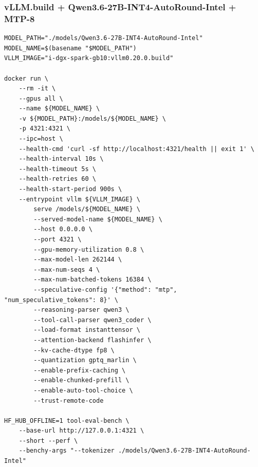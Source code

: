 \documentclass{article}
\begin{document}
\subsubsection{vLLM.build + Qwen3.6-27B-INT4-AutoRound-Intel + MTP-8}
\begin{lstlisting}
MODEL_PATH="./models/Qwen3.6-27B-INT4-AutoRound-Intel"
MODEL_NAME=$(basename "$MODEL_PATH")
VLLM_IMAGE="i-dgx-spark-gb10:vllm0.20.0.build"

docker run \
    --rm -it \
    --gpus all \
    --name ${MODEL_NAME} \
    -v ${MODEL_PATH}:/models/${MODEL_NAME} \
    -p 4321:4321 \
    --ipc=host \
    --health-cmd 'curl -sf http://localhost:4321/health || exit 1' \
    --health-interval 10s \
    --health-timeout 5s \
    --health-retries 60 \
    --health-start-period 900s \
    --entrypoint vllm ${VLLM_IMAGE} \
        serve /models/${MODEL_NAME} \
        --served-model-name ${MODEL_NAME} \
        --host 0.0.0.0 \
        --port 4321 \
        --gpu-memory-utilization 0.8 \
        --max-model-len 262144 \
        --max-num-seqs 4 \
        --max-num-batched-tokens 16384 \
        --speculative-config '{"method": "mtp", "num_speculative_tokens": 8}' \
        --reasoning-parser qwen3 \
        --tool-call-parser qwen3_coder \
        --load-format instanttensor \
        --attention-backend flashinfer \
        --kv-cache-dtype fp8 \
        --quantization gptq_marlin \
        --enable-prefix-caching \
        --enable-chunked-prefill \
        --enable-auto-tool-choice \
        --trust-remote-code

HF_HUB_OFFLINE=1 tool-eval-bench \
    --base-url http://127.0.0.1:4321 \
    --short --perf \
    --benchy-args "--tokenizer ./models/Qwen3.6-27B-INT4-AutoRound-Intel"
\end{lstlisting}
\end{document}
